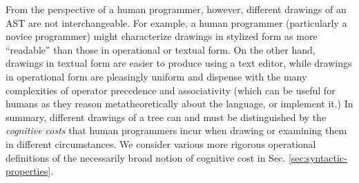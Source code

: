 From the perspective of a human programmer, however, different drawings of an AST are not interchangeable. For example, a human programmer (particularly a novice programmer) might characterize drawings in stylized form as more ``readable'' than those in operational or textual form. On the other hand, drawings in textual form are easier to produce using a text editor, while drawings in operational form are pleasingly uniform and dispense with the many complexities of operator precedence and associativity (which can be useful for humans as they reason metatheoretically about the language, or implement it.) %
In summary, different drawings of a tree can and must be distinguished by the \emph{cognitive costs}  that human programmers incur when drawing or examining them in different circumstances. We consider various more rigorous operational definitions of the necessarily broad notion of cognitive cost in Sec. \ref{sec:syntactic-properties}. %

